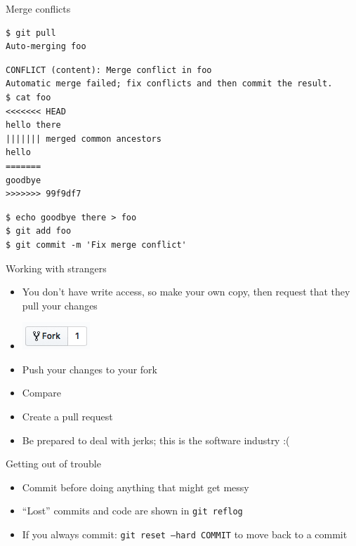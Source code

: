 \documentclass[xcolor=svgnames,17pt]{beamer}
\newcommand*{\sizefont}[1]{%
    \ifcase#1\relax
    \or \tiny
    \or \scriptsize
    \or \footnotesize
    \or \small
    \or \normalsize
    \or \large
    \or \Large
    \or \LARGE
    \or \huge
    \or \Huge
    \fi}
\begin{document}
\begin{frame}[fragile]{Merge conflicts}
\sizefont{2}
\begin{verbatim}
$ git pull
Auto-merging foo
\end{verbatim}
\pause
\begin{verbatim}
CONFLICT (content): Merge conflict in foo
Automatic merge failed; fix conflicts and then commit the result.
$ cat foo
<<<<<<< HEAD
hello there
||||||| merged common ancestors
hello
=======
goodbye
>>>>>>> 99f9df7
\end{verbatim}
\pause
\begin{verbatim}
$ echo goodbye there > foo
$ git add foo
$ git commit -m 'Fix merge conflict'
\end{verbatim}
\end{frame}

\begin{frame}{Working with strangers}
\begin{itemize}
\item You don’t have write access, so make your own copy, then request that
they pull your changes
\pause
\item \includegraphics[height=\baselineskip]{github-fork-button.png}
\pause
\item Push your changes to your fork
\pause
\item Compare \\
\pause
\item Create a pull request
\pause
\item Be prepared to deal with jerks; this is the software industry :(
\end{itemize}
\end{frame}

\begin{frame}{Getting out of trouble}
\begin{itemize}
\item Commit before doing anything that might get messy
\pause
\item “Lost” commits and code are shown in \texttt{git reflog}
\pause
\item If you always commit: \texttt{git reset --hard COMMIT} to move back
to a commit
\end{itemize}
\end{frame}
\end{document}
